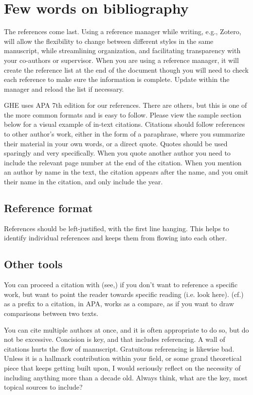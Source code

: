 \cleardoublepage%
\chapter{\label{chap:bib_des}Few words on bibliography}%

The references come last. Using a reference manager while writing, e.g., Zotero, will allow the flexibility to change between different styles in the same manuscript, while streamlining organization, and facilitating transparency with your co-authors or supervisor. When you are using a reference manager, it will create the reference list at the end of the document though you will need to check each reference to make sure the information is complete. Update within the manager and reload the list if necessary.

\medskip

GHE uses APA 7th edition for our references. There are others, but this is one of the more common formats and is easy to follow. Please view the sample section below for a visual example of in-text citations. Citations should follow references to other author’s work, either in the form of a paraphrase, where you summarize their material in your own words, or a direct quote. Quotes should be used sparingly and very specifically. When you quote another author you need to include the relevant page number at the end of the citation. When you mention an author by name in the text, the citation appears after the name, and you omit their name in the citation, and only include the year.

\section{\label{sec:bib_des_format}Reference format}

References should be left-justified, with the first line hanging. This helps to identify individual references and keeps them from flowing into each other.

\section{\label{sec:bib_tools}Other tools}

You can proceed a citation with (see,) if you don’t want to reference a specific work, but want to point the reader towards specific reading (i.e. look here). (cf.) as a prefix to a citation, in APA, works as a compare, as if you want to draw comparisons between two texts.

\medskip

You can cite multiple authors at once, and it is often appropriate to do so, but do not be excessive. Concision is key, and that includes referencing. A wall of citations hurts the flow of manuscript. Gratuitous referencing is likewise bad. Unless it is a hallmark contribution within your field, or some grand theoretical piece that keeps getting built upon, I would seriously reflect on the necessity of including anything more than a decade old. Always think, what are the key, most topical sources to include? 
